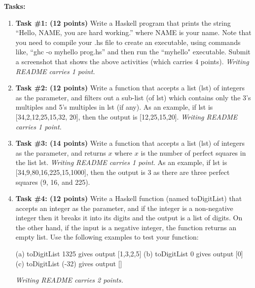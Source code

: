 \documentclass[paper=letter, fontsize=11pt]{scrartcl} %
\begin{document}
    \textbf{Tasks:}
    \begin{enumerate}

        \item \textbf{Task \#1: (12 points)} Write a Haskell program that prints the string ``Hello, NAME, you are hard working.'' where NAME is your name. 
Note that you need to compile your .hs file to create an executable, using commands like, ``ghc -o myhello  prog.hs'' and then run the ``myhello" executable.
Submit a screenshot that shows the above activities (which carries 4 points). \emph{Writing README carries 1 point.}

        \item \textbf{Task \#2: (12 points)} Write a function that accepts a list (lst) of integers as the parameter, and 
filters out a sub-list (of lst) which contains only the 3's multiples and 5's multiples in lst (if any). 
As an example, if lst is [34,2,12,25,15,32, 20], then the output is [12,25,15,20]. \emph{Writing README carries 1 point.}

        \item \textbf{Task \#3: (14 points)} Write a function that accepts a list (lst) of integers as the parameter, and 
returns $x$ where $x$ is the number of perfect squares in the list lst. \emph{Writing README carries 1 point.}
As an example, if lst is [34,9,80,16,225,15,1000], then the output is 3 as there are three perfect squares (9, 16, and 225).
        
	\item \textbf{Task \#4: (12 points)} Write a Haskell function (named toDigitList) that accepts an integer 
as the parameter, and if the integer is a non-negative integer then it breaks it into its digits and the output is a list of digits. 
On the other hand, if the input is a negative integer, the function returns an empty list. 
Use the following examples to test your function: 

(a) toDigitList 1325 gives output [1,3,2,5]
(b) toDigitList 0 gives output [0]
(c) toDigitList (-32) gives output []

\emph{Writing README carries 2 points.}

    
    \end{enumerate}
\end{document}
